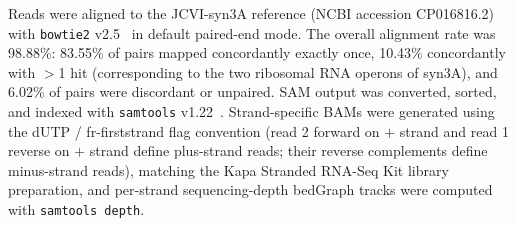 Reads were aligned to the JCVI-syn3A reference (NCBI accession CP016816.2) with \texttt{bowtie2} v2.5~\cite{langmead2012bowtie2} in default paired-end mode. The overall alignment rate was 98.88\%: 83.55\% of pairs mapped  concordantly exactly once, 10.43\% concordantly with $>$1 hit (corresponding to the two ribosomal RNA operons of syn3A), and 6.02\% of pairs were discordant or unpaired. SAM output was converted, sorted, and indexed with \texttt{samtools} v1.22~\cite{li2009samtools}. Strand-specific BAMs were generated using the dUTP / fr-firststrand flag convention (read 2 forward on $+$ strand and read 1 reverse on $+$ strand define plus-strand reads; their reverse complements define minus-strand reads), matching the Kapa Stranded RNA-Seq Kit library preparation, and per-strand sequencing-depth bedGraph tracks were computed with \texttt{samtools depth}.